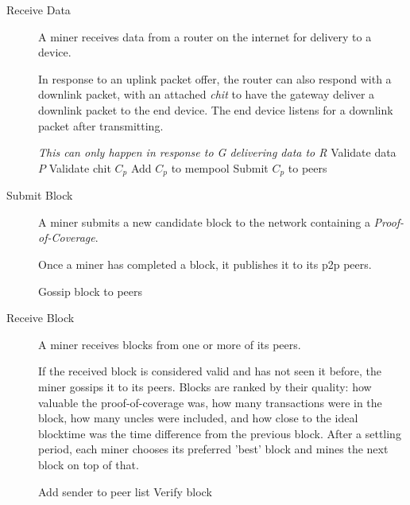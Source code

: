 \documentclass[UTF8, 10pt, nonatbib, nocopyrightspace, reprint]{sigplanconf}
\newenvironment{protocol}[2]{
  \begin{algorithm}[!htb]
    \DontPrintSemicolon
    \caption{#1}\label{#2}
}{
  \end{algorithm}
  \FloatBarrier
}
\begin{document}
\begin{description}
  \item [Receive Data] A miner receives data from a router on the internet for delivery to a device.

    In response to an uplink packet offer, the router can also respond with a downlink packet, with an attached \emph{chit} to have the gateway deliver a downlink packet to the end device. The end device listens for a downlink packet after transmitting.

    \begin{protocol}{Miner Receive Router Data}{proto:miner.data.receive}

       {
        \emph{This can only happen in response to G delivering data to R}
        Validate data $P$ \;
        Validate chit $C_p$\;
         \;
        Add $C_p$ to mempool\;
        Submit $C_p$ to peers\;
      }
    \end{protocol}



  \item [Submit Block] A miner submits a new candidate block to the network containing a \emph{Proof-of-Coverage}.

    Once a miner has completed a block, it publishes it to its p2p peers.

    \begin{protocol}{Miner Block Submit}{proto:miner.block.submit}

       {
        Gossip block to peers\;
      }
    \end{protocol}


  \item [Receive Block] A miner receives blocks from one or more of its peers.

    If the received block is considered valid and has not seen it before, the miner gossips it to its peers. Blocks are ranked by their quality: how valuable the proof-of-coverage was, how many transactions were in the block, how many uncles were included, and how close to the ideal blocktime was the time difference from the previous block. After a settling period, each miner chooses its preferred 'best' block and mines the next block on top of that.

    \begin{protocol}{Miner Block Receive}{proto:miner.block.recv}

       {
        Add sender to peer list\;
        Verify block\;
      }
    \end{protocol}


\end{description}
\end{document}
